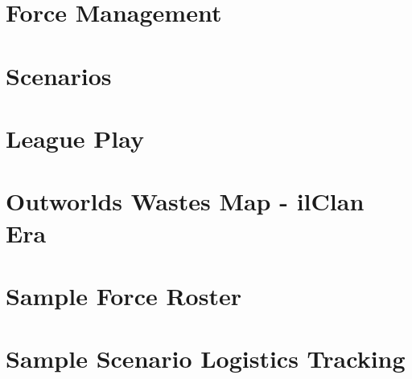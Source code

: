 \documentclass{article}
\begin{document}
\section{Force Management}



\newpage

\section{Scenarios}



\newpage

\section{League Play}



\newpage

\section{Outworlds Wastes Map - ilClan Era}



\newpage

\section{Sample Force Roster}



\newpage

\section{Sample Scenario Logistics Tracking}
\end{document}
